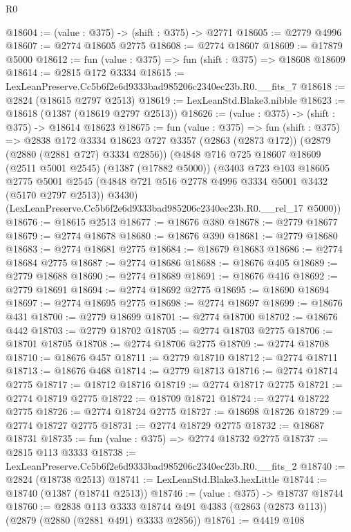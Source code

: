 \begin{lexlean}{R0}
\begin{coremodule}
@18604 := (value : @375) -> (shift : @375) -> @2771
@18605 := @2779 @4996
@18607 := @2774 @18605 @2775
@18608 := @2774 @18607
@18609 := @17879 @5000
@18612 := fun (value : @375) => fun (shift : @375) => @18608 @18609
@18614 := @2815 @172 @3334
@18615 := LexLeanPreserve.Cc5b6f2e6d9333bad985206c2340ec23b.R0.__fits_7
@18618 := @2824 (@18615 @2797 @2513)
@18619 := LexLeanStd.Blake3.nibble
@18623 := @18618 (@1387 (@18619 @2797 @2513))
@18626 := (value : @375) -> (shift : @375) -> @18614 @18623
@18675 := fun (value : @375) =>
  fun (shift : @375) =>
  @2838
    @172
    @3334
    @18623
    @727
    @3357
    (@2863 (@2873 @172))
    (@2879 (@2880 (@2881 @727) @3334 @2856))
    (@4848
      @716
      @725
      @18607
      @18609
      (@2511 @5001 @2545)
      (@1387 (@17882 @5000))
      (@3403
        @723
        @103
        @18605
        @2775
        @5001
        @2545
        (@4848 @721 @516 @2778 @4996 @3334 @5001 @3432 (@5170 @2797 @2513))
        @3430)
      (LexLeanPreserve.Cc5b6f2e6d9333bad985206c2340ec23b.R0.__rel_17 @5000))
@18676 := @18615 @2513
@18677 := @18676 @380
@18678 := @2779 @18677
@18679 := @2774 @18678
@18680 := @18676 @390
@18681 := @2779 @18680
@18683 := @2774 @18681 @2775
@18684 := @18679 @18683
@18686 := @2774 @18684 @2775
@18687 := @2774 @18686
@18688 := @18676 @405
@18689 := @2779 @18688
@18690 := @2774 @18689
@18691 := @18676 @416
@18692 := @2779 @18691
@18694 := @2774 @18692 @2775
@18695 := @18690 @18694
@18697 := @2774 @18695 @2775
@18698 := @2774 @18697
@18699 := @18676 @431
@18700 := @2779 @18699
@18701 := @2774 @18700
@18702 := @18676 @442
@18703 := @2779 @18702
@18705 := @2774 @18703 @2775
@18706 := @18701 @18705
@18708 := @2774 @18706 @2775
@18709 := @2774 @18708
@18710 := @18676 @457
@18711 := @2779 @18710
@18712 := @2774 @18711
@18713 := @18676 @468
@18714 := @2779 @18713
@18716 := @2774 @18714 @2775
@18717 := @18712 @18716
@18719 := @2774 @18717 @2775
@18721 := @2774 @18719 @2775
@18722 := @18709 @18721
@18724 := @2774 @18722 @2775
@18726 := @2774 @18724 @2775
@18727 := @18698 @18726
@18729 := @2774 @18727 @2775
@18731 := @2774 @18729 @2775
@18732 := @18687 @18731
@18735 := fun (value : @375) => @2774 @18732 @2775
@18737 := @2815 @113 @3333
@18738 := LexLeanPreserve.Cc5b6f2e6d9333bad985206c2340ec23b.R0.__fits_2
@18740 := @2824 (@18738 @2513)
@18741 := LexLeanStd.Blake3.hexLittle
@18744 := @18740 (@1387 (@18741 @2513))
@18746 := (value : @375) -> @18737 @18744
@18760 := @2838
    @113
    @3333
    @18744
    @491
    @4383
    (@2863 (@2873 @113))
    (@2879 (@2880 (@2881 @491) @3333 @2856))
@18761 := @4419 @108

\end{coremodule}
\end{lexlean}
